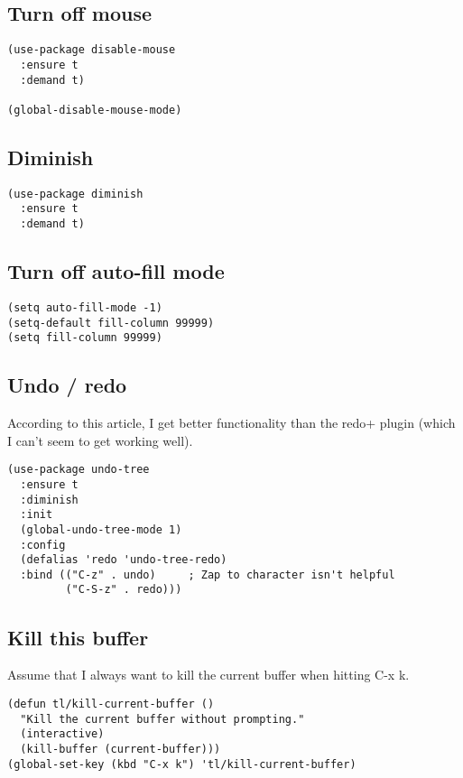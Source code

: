 \documentclass[12pt]{article}
\begin{document}
\subsection{Turn off  mouse}
\label{sec:org7d180a0}

\begin{verbatim}
(use-package disable-mouse
  :ensure t 
  :demand t)

(global-disable-mouse-mode)

\end{verbatim}
\subsection{Diminish}
\label{sec:orga93e0fc}

\begin{verbatim}
(use-package diminish 
  :ensure t 
  :demand t)
\end{verbatim}

\subsection{Turn off auto-fill mode}
\label{sec:org0cab21e}

\begin{verbatim}
(setq auto-fill-mode -1)
(setq-default fill-column 99999)
(setq fill-column 99999)
\end{verbatim}

\subsection{Undo / redo}
\label{sec:org0e5cdf8}
According to this article, I get better functionality than the redo+ plugin (which I can’t seem to get working well).
\begin{verbatim}
(use-package undo-tree
  :ensure t
  :diminish
  :init
  (global-undo-tree-mode 1)
  :config
  (defalias 'redo 'undo-tree-redo)
  :bind (("C-z" . undo)     ; Zap to character isn't helpful
         ("C-S-z" . redo)))

\end{verbatim}

\subsection{Kill this buffer}
\label{sec:org1db48ed}
Assume that I always want to kill the current buffer when hitting C-x k.
\begin{verbatim}
(defun tl/kill-current-buffer ()
  "Kill the current buffer without prompting."
  (interactive)
  (kill-buffer (current-buffer)))
(global-set-key (kbd "C-x k") 'tl/kill-current-buffer)
\end{verbatim}
\end{document}
